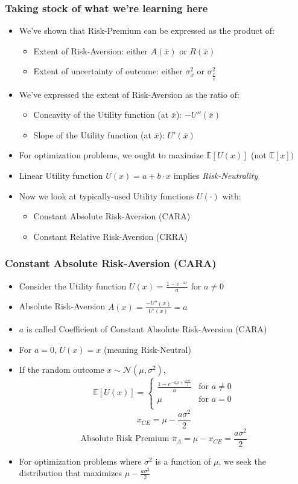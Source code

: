 \documentclass[handout]{beamer}
\begin{document}
\begin{frame}
\frametitle{Taking stock of what we're learning here}
\pause
\begin{itemize}[<+->]
\item We've shown that Risk-Premium can be expressed as the product of:
\begin{itemize}
\item Extent of Risk-Aversion: either $A(\bar{x})$ or $R(\bar{x})$
\item Extent of uncertainty of outcome: either $\sigma_x^2$ or $\sigma_{\frac {x} {\bar{x}}}^2$
\end{itemize}
\item We've expressed the extent of Risk-Aversion as the ratio of:
\begin{itemize}
\item Concavity of the Utility function (at $\bar{x}$): $-U''(\bar{x})$
\item Slope of the Utility function (at $\bar{x}$): $U'(\bar{x})$
\end{itemize}
\item For optimization problems, we ought to maximize $\mathbb{E}[U(x)]$ (not $\mathbb{E}[x])$
\item Linear Utility function $U(x) = a + b \cdot x$ implies {\em Risk-Neutrality}
\item Now we look at typically-used Utility functions $U(\cdot)$ with:
\begin{itemize}
\item Constant Absolute Risk-Aversion (CARA)
\item Constant Relative Risk-Aversion (CRRA)
\end{itemize}
\end{itemize}
\end{frame}

\begin{frame}
\frametitle{Constant Absolute Risk-Aversion (CARA)}
\pause
\begin{itemize}[<+->]
\item Consider the Utility function $U(x) = \frac {1 - e^{-ax}} {a}$ for $a \neq 0$
\item Absolute Risk-Aversion $A(x) = \frac {-U''(x)} {U'(x)} = a$
\item $a$ is called Coefficient of Constant Absolute Risk-Aversion (CARA)
\item For $a=0$, $U(x) = x$ (meaning Risk-Neutral)
\item If the random outcome $x \sim \mathcal{N}(\mu, \sigma^2)$,
$$
\mathbb{E}[U(x)] = 
\begin{cases}
\frac {1 - e^{-a \mu + \frac {a^2 \sigma^2} 2}} a & \text{for } a \neq 0\\
\mu & \text {for } a = 0\\
\end{cases}
$$
$$x_{CE} = \mu - \frac {a \sigma^2} 2$$
$$\mbox{Absolute Risk Premium } \pi_A = \mu - x_{CE} =  \frac {a \sigma^2} 2$$
\item For optimization problems where $\sigma^2$ is a function of $\mu$, we seek the distribution that maximizes $\mu - \frac {a \sigma^2} 2$
\end{itemize}
\end{frame}
\end{document}
